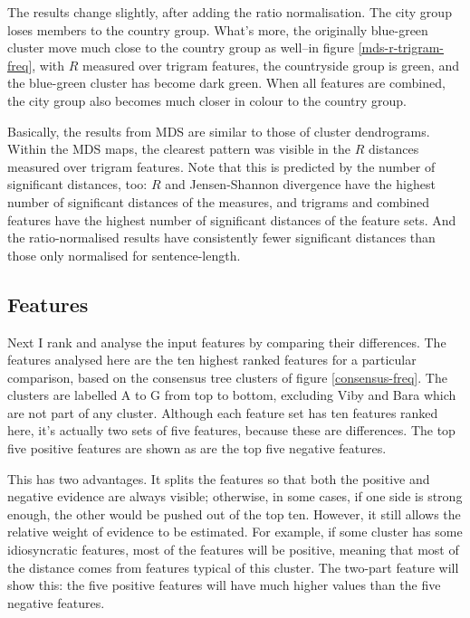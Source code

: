 The results change slightly, after adding the ratio normalisation. The
city group loses members to the country group. What's more, the
originally blue-green cluster move much close to the country group
as well--in figure \ref{mds-r-trigram-freq}, with
$R$ measured over trigram features, the countryside group is green,
and the blue-green cluster has become dark green. When all features
are combined, the city group also becomes much closer in colour to the
country group.

Basically, the results from MDS are similar to those of cluster
dendrograms. Within the MDS maps, the clearest pattern was visible in
the $R$ distances measured over trigram features. Note that this is
predicted by the number of significant distances, too: $R$ and
Jensen-Shannon divergence have the highest number of significant
distances of the measures, and trigrams and combined features have the
highest number of significant distances of the feature sets. And the
ratio-normalised results have consistently fewer significant distances
than those only normalised for sentence-length.

\subsection{Features}


Next I rank and analyse the input features by comparing their
differences. The features analysed here are the
ten highest ranked features for a particular comparison, based on the
consensus tree clusters of figure \ref{consensus-freq}. The clusters
are labelled A to G from top to bottom, excluding Viby and Bara which
are not part of any cluster. Although each feature set has ten
features ranked here, it's actually two sets of five features, because
these are differences. The top five positive features are shown as are
the top five negative features.

This has two advantages. It splits the features so that both the
positive and negative evidence are always visible; otherwise, in some
cases, if one side is strong enough, the other would be pushed out of
the top ten. However, it still allows the relative weight of evidence
to be estimated. For example, if some cluster has some idiosyncratic
features, most of the features will be positive, meaning that most of
the distance comes from features typical of this cluster. The two-part
feature will show this: the five positive features will have much
higher values than the five negative features.


